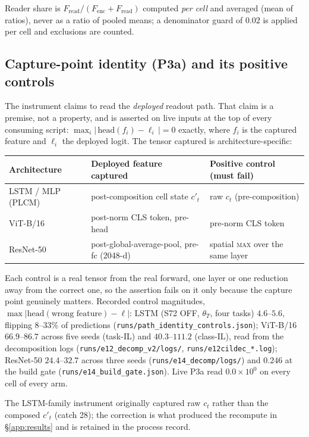 Reader share is $F_{\mathrm{read}}/(F_{\mathrm{enc}}+F_{\mathrm{read}})$ computed
\emph{per cell} and averaged (mean of ratios), never as a ratio of pooled means;
a denominator guard of $0.02$ is applied per cell and exclusions are counted.

\subsection{Capture-point identity (P3a) and its positive controls}

The instrument claims to read the \emph{deployed} readout path. That claim is
a premise, not a property, and is asserted on live inputs at the top of every
consuming script:
$\max_i \left|\,\mathrm{head}(f_i) - \ell_i\,\right| = 0$ exactly, where $f_i$ is
the captured feature and $\ell_i$ the deployed logit. The tensor captured is
architecture-specific:

\begin{center}\small
\begin{tabular}{@{}lll@{}}
\toprule
Architecture & Deployed feature captured & Positive control (must fail) \\
\midrule
LSTM / MLP (PLCM) & post-composition cell state $c'_t$ & raw $c_t$ (pre-composition) \\
ViT-B/16 & post-norm CLS token, pre-head & pre-norm CLS token \\
ResNet-50 & post-global-average-pool, pre-fc (2048-d) & spatial \textsc{max} over the same layer \\
\bottomrule
\end{tabular}
\end{center}

Each control is a real tensor from the real forward, one layer or one reduction
away from the correct one, so the assertion fails on it only because the
capture point genuinely matters. Recorded control magnitudes,
$\max|\mathrm{head}(\text{wrong feature}) - \ell|$: LSTM (S72 OFF, $\theta_T$,
four tasks) $4.6$--$5.6$, flipping 8--33\% of predictions
(\texttt{runs/path\_identity\_controls.json}); ViT-B/16 $66.9$--$86.7$ across
five seeds (task-IL) and $40.3$--$111.2$ (class-IL), read from the
decomposition logs (\texttt{runs/e12\_decomp\_v2/logs/},
\texttt{runs/e12cildec\_*.log}); ResNet-50 $24.4$--$32.7$ across three seeds
(\texttt{runs/e14\_decomp/logs/}) and $0.246$ at the build gate
(\texttt{runs/e14\_build\_gate.json}). Live P3a read $0.0\times10^{0}$ on every
cell of every arm.

The LSTM-family instrument originally captured raw $c_t$ rather than the
composed $c'_t$ (catch 28); the correction is what produced the recompute in
\S\ref{app:results} and is retained in the process record.

